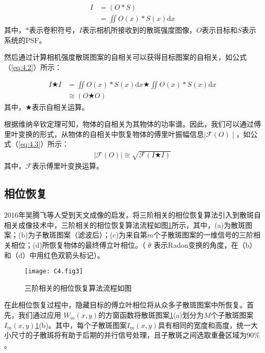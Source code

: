 \begin{equation}
\begin{aligned}
    I &= (O*S)\\
      &= \iint O(x)*S(x) \mathrm{d}{x}
\end{aligned}
\label{eq:4.1}
\end{equation}
其中，$*$表示卷积符号，$I$表示相机所接收到的散斑强度图像，$O$表示目标和$S$表示系统的PSF。

然后通过计算相机强度散斑图案的自相关可以获得目标图案的自相关，如公式（\ref{eq:4.2}）所示：

\begin{equation}
\begin{aligned}
    I \bigstar I  &= \iint O(x)*S(x) \mathrm{d}{x} \bigstar \iint O(x)*S(x) \mathrm{d}{x} \\
		              & \cong  (O \bigstar O)
\end{aligned}
\label{eq:4.2}
\end{equation}其中，$\bigstar$表示自相关运算。

根据维纳辛钦定理可知，物体的自相关为其物体的功率谱。因此，我们可以通过傅里叶变换的形式，从物体的自相关中恢复物体的傅里叶振幅信息$\mid \mathcal{F}(O) \mid $，如公式（\ref{eq:4.3}）所示：
\begin{equation}
\begin{aligned}
   \mid \mathcal{F}(O) \mid \cong \sqrt{\mathcal{F}(I \bigstar I)}
\end{aligned}
\label{eq:4.3}
\end{equation}其中，$\mathcal{F}$表示傅里叶变换运算。

\subsection{相位恢复}

2016年吴腾飞等人\cite{wu_single-shot_2016}受到天文成像的启发，将三阶相关的相位恢复算法引入到散斑自相关成像技术中，三阶相关的相位恢复算法流程如图\ref{fig:4.3}所示，其中，(a)为散斑图案；(b)为子散斑图案（滤波后）；(c)为来自第$m$个子散斑图案的一维信号的三阶相关相位；(d)所恢复物体的最终傅立叶相位。（ $\theta$ 表示Radon变换的角度，在（b）和（d）中用红色双箭头标记）。

\begin{figure}[htp]
	\centering
	\texttt{[image: C4.fig3]}
	\caption{三阶相关的相位恢复算法流程如图}
	\label{fig:4.3}
\end{figure}

在此相位恢复过程中，隐藏目标的傅立叶相位将从众多子散斑图案中所恢复。首先，我们通过应用 $W_m(x,y)$的方窗函数将散斑图案\ref{fig:4.3}(a)划分为$M$个子散斑图案$I_m(x,y)$\ref{fig:4.3}(b)。其中，每个子散斑图案$I_m(x,y)$具有相同的宽度和高度，统一大小尺寸的子散斑将有助于后期的并行信号处理，且子散斑之间选取重叠区域为$90\%$。

